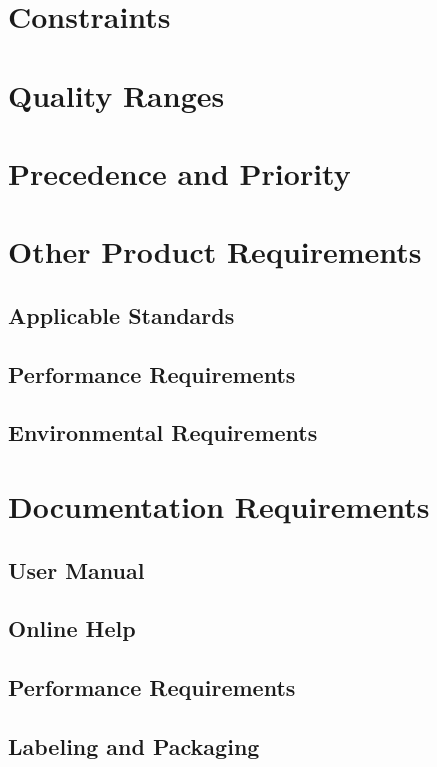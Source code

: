 \documentclass[12pt,norsk,a4paper]{article}
\begin{document}
\section{Constraints}

\section{Quality Ranges}


\section{Precedence and Priority}

\section{Other Product Requirements}
\subsection{Applicable Standards}

\subsection{Performance Requirements}

\subsection{Environmental Requirements}


\section{Documentation Requirements}
\subsection{User Manual}

\subsection{Online Help}

\subsection{Performance Requirements}

\subsection{Labeling and Packaging}


\printbibliography{}
\end{document}
